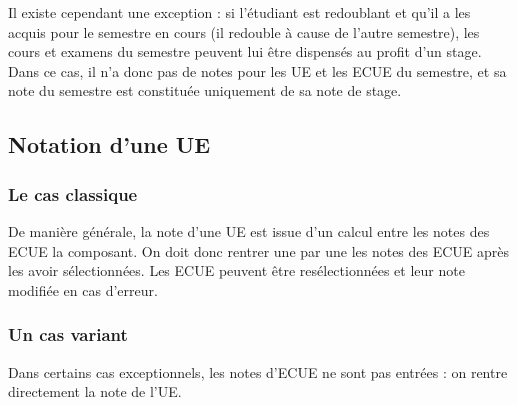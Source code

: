 \documentclass[letter, 11pt] {article}
\begin{document}
		Il existe cependant une exception : si l’étudiant est redoublant et qu’il a les acquis pour le semestre en cours (il redouble à cause de l’autre semestre), les cours et examens du semestre peuvent lui être dispensés au profit d’un stage. Dans ce cas, il n’a donc pas de notes pour les UE et les ECUE du semestre, et sa note du semestre est constituée uniquement de sa note de stage.
		
		\subsection{Notation d'une UE}
		
		\subsubsection*{Le cas classique}
		
		De manière générale, la note d’une UE est issue d’un calcul entre les notes des ECUE la composant. On doit donc rentrer une par une les notes des ECUE après les avoir sélectionnées. Les ECUE peuvent être resélectionnées et leur note modifiée en cas d’erreur.

		\subsubsection*{Un cas variant}
	
		Dans certains cas exceptionnels, les notes d’ECUE ne sont pas entrées : on rentre directement la note de l’UE.
		
		\newpage
		
\end{document}
